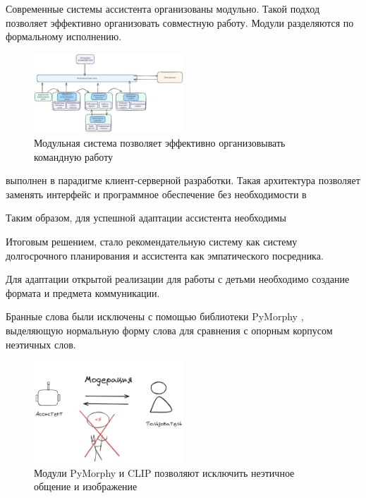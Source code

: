 Современные системы ассистента организованы модульно. Такой подход позволяет эффективно
организовать совместную работу. Модули разделяются по формальному исполнению.


\begin{figure}[h]
    \centering
    \includegraphics[width=0.5\textwidth]{assets/work/arch/modern_system.excalidraw.png}
    \caption{Модульная система позволяет эффективно организовывать командную работу}
    \label{modular}
\end{figure}




выполнен в парадигме клиент-серверной разработки. Такая архитектура
позволяет заменять интерфейс и программное обеспечение без необходимости в 

Таким образом, для успешной адаптации ассистента необходимы

Итоговым решением, стало  рекомендательную систему как систему долгосрочного планирования и ассистента как эмпатического посредника.





Для адаптации открытой реализации для работы с детьми необходимо создание формата и предмета коммуникации.

Бранные слова были исключены с помощью библиотеки PyMorphy \cite{Korobov2015morph}, выделяющую нормальную форму слова для сравнения
с опорным корпусом неэтичных слов.

\begin{figure}[h]
    \centering
    \includegraphics[width=0.5\textwidth]{assets/work/arch/detox.excalidraw.png}
    \caption{Модули PyMorphy \cite{Korobov2015morph} и CLIP позволяют исключить неэтичное общение и изображение }
    \label{detox}
\end{figure}

